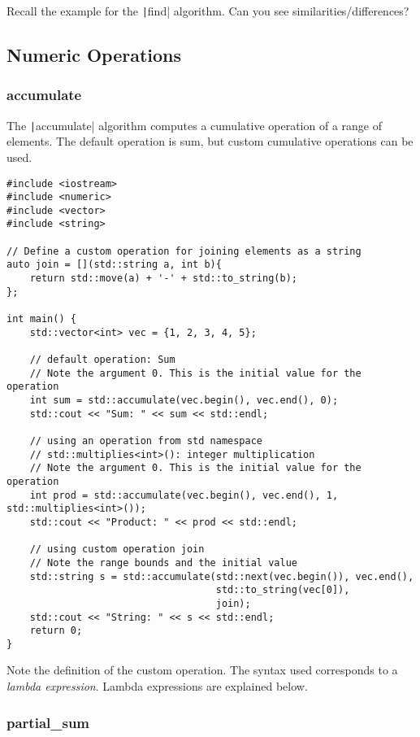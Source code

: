 \documentclass{article}
\begin{document}
Recall the example for the \texttt|find| algorithm. Can you see similarities/differences?

\subsection{Numeric Operations}

\subsubsection{accumulate}

The \texttt|accumulate| algorithm computes a cumulative operation of a range of elements. The default operation is sum, but custom cumulative operations can be used.

\begin{verbatim}
#include <iostream>
#include <numeric>
#include <vector>
#include <string>

// Define a custom operation for joining elements as a string
auto join = [](std::string a, int b){
    return std::move(a) + '-' + std::to_string(b);
};

int main() {
    std::vector<int> vec = {1, 2, 3, 4, 5};
    
    // default operation: Sum
    // Note the argument 0. This is the initial value for the operation
    int sum = std::accumulate(vec.begin(), vec.end(), 0);
    std::cout << "Sum: " << sum << std::endl;
    
    // using an operation from std namespace 
    // std::multiplies<int>(): integer multiplication
    // Note the argument 0. This is the initial value for the operation
    int prod = std::accumulate(vec.begin(), vec.end(), 1, std::multiplies<int>());
    std::cout << "Product: " << prod << std::endl;
    
    // using custom operation join
    // Note the range bounds and the initial value
    std::string s = std::accumulate(std::next(vec.begin()), vec.end(),
                                    std::to_string(vec[0]), 
                                    join);
    std::cout << "String: " << s << std::endl;
    return 0;
}
\end{verbatim}

Note the definition of the custom operation. The syntax used corresponds to a \textit{lambda expression}. Lambda expressions are explained below.

\subsubsection{partial\_sum}
\end{document}
